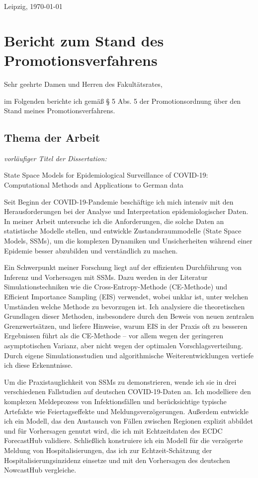 \documentclass[a4paper,10pt]{article}
\begin{document}
\begin{flushright}
Leipzig, \today
\end{flushright}

\section*{Bericht zum Stand des Promotionsverfahrens}

Sehr geehrte Damen und Herren des Fakultätsrates,

im Folgenden berichte ich gemäß § 5 Abs. 5 der Promotionsordnung über den Stand meines Promotionsverfahrens.

\subsection*{Thema der Arbeit}
\textit{vorläufiger Titel der Dissertation:} 
\begin{center}State Space Models for Epidemiological Surveillance of COVID-19: Computational Methods and Applications to German data
\end{center}
\vspace{1em}
Seit Beginn der COVID-19-Pandemie beschäftige ich mich intensiv mit den Herausforderungen bei der Analyse und Interpretation epidemiologischer Daten. In meiner Arbeit untersuche ich die Anforderungen, die solche Daten an statistische Modelle stellen, und entwickle Zustandsraummodelle (State Space Models, SSMs), um die komplexen Dynamiken und Unsicherheiten während einer Epidemie besser abzubilden und verständlich zu machen.

Ein Schwerpunkt meiner Forschung liegt auf der effizienten Durchführung von Inferenz und Vorhersagen mit SSMs. Dazu werden in der Literatur Simulationstechniken wie die Cross-Entropy-Methode (CE-Methode) und Efficient Importance Sampling (EIS) verwendet, wobei unklar ist, unter welchen Umständen welche Methode zu bevorzugen ist. Ich analysiere die theoretischen Grundlagen dieser Methoden, insbesondere durch den Beweis von neuen zentralen Grenzwertsätzen, und liefere Hinweise, warum EIS in der Praxis oft zu besseren Ergebnissen führt als die CE-Methode – vor allem wegen der geringeren asymptotischen Varianz, aber nicht wegen der optimalen Vorschlagsverteilung. Durch eigene Simulationsstudien und algorithmische Weiterentwicklungen vertiefe ich diese Erkenntnisse.

Um die Praxistauglichkeit von SSMs zu demonstrieren, wende ich sie in drei verschiedenen Fallstudien auf deutschen COVID-19-Daten an. Ich modelliere den komplexen Meldeprozess von Infektionsfällen und berücksichtige typische Artefakte wie Feiertagseffekte und Meldungsverzögerungen. Außerdem entwickle ich ein Modell, das den Austausch von Fällen zwischen Regionen explizit abbildet und für Vorhersagen genutzt wird, die ich mit Echtzeitdaten des ECDC ForecastHub validiere. Schließlich konstruiere ich ein Modell für die verzögerte Meldung von Hospitalisierungen, das ich zur Echtzeit-Schätzung der Hospitalisierungsinzidenz einsetze und mit den Vorhersagen des deutschen NowcastHub vergleiche.
\end{document}
